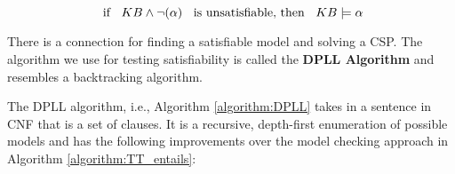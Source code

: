 \begin{equation}
\text{  if } \hspace{0.2cm} KB \wedge \neg (\alpha) \hspace{0.2cm} \text{  is unsatisfiable,  then  } \hspace{0.2cm} KB \models \alpha
\label{eq:sat}
\end{equation}

There is a connection for finding a satisfiable model and solving a CSP. The algorithm we use for testing satisfiability is called the \textbf{DPLL Algorithm} and resembles a backtracking algorithm. 


The DPLL algorithm, i.e., Algorithm \ref{algorithm:DPLL} takes in a sentence in CNF that is a set of clauses. It is a recursive, depth-first enumeration of possible models and has the following improvements over the model checking approach in Algorithm \ref{algorithm:TT_entails}:


